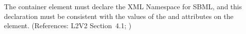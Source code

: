 The  container element must declare the XML Namespace
for SBML, and this declaration must be consistent with the values
of the  and  attributes on the 
 element.  (References: L2V2 Section~4.1;
)
